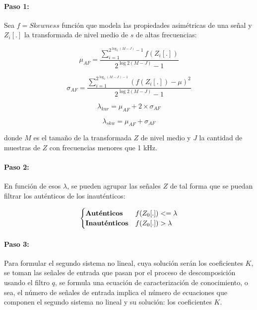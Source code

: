 \documentclass[11pt]{article}
\begin{document}
\paragraph*{Paso 1:}
Sea \(f = Skewness \) función que modela las propiedades asimétricas de una señal y \(Z_{i}[.]\) la transformada de nivel medio de \(s\) de altas frecuencias:

\begin{equation}
    \mu_{AF} = \frac{\sum_{i=1}^{2^{\log_{2}(M - J)} - 1} f(Z_{i}[.])}{2^{\log{2}(M - J)} - 1}
\end{equation}

\begin{equation}
    \sigma_{AF} = \frac{\sum_{i=1}^{2^{\log_{2}(M - J) - 1}}(f(Z_{i}[.]) - \mu )^2}{2^{\log{2}(M - J)} - 1}
\end{equation}

\begin{equation}
    \lambda_{kur} = \mu_{AF} + 2 \times \sigma_{AF}
\end{equation}

\begin{equation}
    \lambda_{skw} = \mu_{AF} + \sigma_{AF}
\end{equation}

donde \(M\) es el tamaño de la transformada \(Z\) de nivel medio y \(J\) la cantidad de muestras de \(Z\) con frecuencias menores que 1 kHz.

\paragraph*{Paso 2:}
En función de esos \(\lambda\), se pueden agrupar las señales \(Z\) de tal forma que se puedan filtrar los auténticos de los inauténticos:

\begin{equation}
    \begin{cases}
        {\bf Aut\acute{e}nticos} & \text {\(f(Z_{0}[.]) <= \lambda\)}\\
        {\bf Inaut\acute{e}nticos} & \text{\(f(Z_{0}[.]) > \lambda\)}\\
    \end{cases}
\end{equation}

\paragraph*{Paso 3:}
Para formular el segundo sistema no lineal, cuya solución serán los coeficientes \(K\), se toman las señales de entrada que pasan por el proceso de descomposición usando el filtro \(q\), 
se formula una ecuación de caracterización de conocimiento, o sea, el número de señales de entrada implica el número de ecuaciones que componen el segundo sistema no lineal y su solución: 
los coeficientes \(K\).
\end{document}
